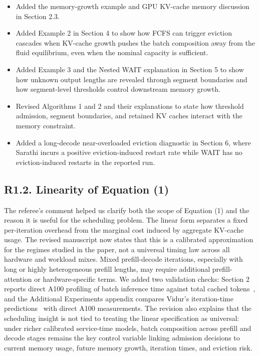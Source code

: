 \changes
\begin{itemize}
    \item Added the memory-growth example and GPU KV-cache memory discussion in Section 2.3.
    \item Added Example 2 in Section 4 to show how FCFS can trigger eviction cascades when KV-cache growth pushes the batch composition away from the fluid equilibrium, even when the nominal capacity is sufficient.
    \item Added Example 3 and the Nested WAIT explanation in Section 5 to show how unknown output lengths are revealed through segment boundaries and how segment-level thresholds control downstream memory growth.
    \item Revised Algorithms 1 and 2 and their explanations to state how threshold admission, segment boundaries, and retained KV caches interact with the memory constraint.
    \item Added a long-decode near-overloaded eviction diagnostic in Section 6, where Sarathi incurs a positive eviction-induced restart rate while WAIT has no eviction-induced restarts in the reported run.
\end{itemize}

\subsection*{R1.2. Linearity of Equation (1)}


\response The referee's comment helped us clarify both the scope of Equation (1) and the reason it is useful for the scheduling problem. The linear form separates a fixed per-iteration overhead from the marginal cost induced by aggregate KV-cache usage. The revised manuscript now states that this is a calibrated approximation for the regimes studied in the paper, not a universal timing law across all hardware and workload mixes. Mixed prefill-decode iterations, especially with long or highly heterogeneous prefill lengths, may require additional prefill-attention or hardware-specific terms. We added two validation checks: Section 2 reports direct A100 profiling of batch inference time against total cached tokens~\citep{nvidia-a100-specs}, and the Additional Experiments appendix compares Vidur's iteration-time predictions~\citep{agrawal2024vidur} with direct A100 measurements. The revision also explains that the scheduling insight is not tied to treating the linear specification as universal: under richer calibrated service-time models, batch composition across prefill and decode stages remains the key control variable linking admission decisions to current memory usage, future memory growth, iteration times, and eviction risk.

